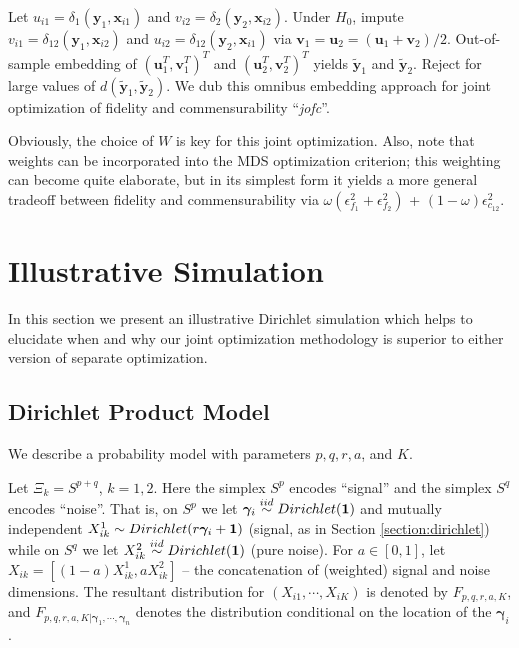 \documentclass[12pt,xcolor]{article}
\newcommand{\1}{\ensuremath{\mbox{{\bf 1}}}}
\newcommand{\iid}{\stackrel{iid}{\sim}}
\begin{document}
  Let $u_{i1} = \delta_1(\bm{y}_{1}, \bm{x}_{i1})$ and $v_{i2} = \delta_2(\bm{y}_{2}, \bm{x}_{i2})$.
  Under $H_0$, impute $v_{i1} = \delta_{12}(\bm{y}_1,\bm{x}_{i2})$ and $u_{i2} = \delta_{12}(\bm{y}_2,\bm{x}_{i1})$
  via $\bm{v}_1 = \bm{u}_2 = (\bm{u}_1 + \bm{v}_2)/2$.
  Out-of-sample embedding of $(\bm{u}_1^T, \bm{v}_1^T)^T$ and $(\bm{u}_2^T, \bm{v}_2^T)^T$ yields $\widetilde{\bm{y}}_1$ and $\widetilde{\bm{y}}_2$.
  Reject for large values of $d(\widetilde{\bm{y}}_1,\widetilde{\bm{y}}_2)$.
We dub this omnibus embedding approach for joint optimization of fidelity and commensurability ``{\it jofc}''.

Obviously, the choice of $W$ is key for this joint optimization.
Also, note that weights can be incorporated into the MDS optimization criterion;
this weighting can become quite elaborate,
but in its simplest form it yields a more general tradeoff between fidelity and commensurability via $\omega (\epsilon^2_{f_{1}} + \epsilon^2_{f_{2}})$ + $(1-\omega) \epsilon^2_{c_{12}}$.

\section{Illustrative Simulation}

In this section we present an illustrative Dirichlet simulation
which helps to elucidate when and why our joint optimization methodology is superior to
either version of separate optimization.

\subsection{Dirichlet Product Model}

We describe a probability model with parameters $p,q,r,a$, and $K$.

Let $\Xi_k = S^{p+q}$, $k=1,2$.
Here the simplex $S^p$ encodes ``signal'' and
the simplex $S^q$ encodes ``noise''.
That is, on $S^p$ we let $\bm{\gamma}_i \iid Dirichlet(\1)$
and mutually independent $X^1_{ik} \sim Dirichlet(r\bm{\gamma}_i+\1)$
(signal, as in Section \ref{section:dirichlet})
while on $S^q$ we let $X^2_{ik} \iid Dirichlet(\1)$ (pure noise).
For $a \in [0,1]$, let $X_{ik} = [(1-a) X^1_{ik} , a X^2_{ik}]$ --
the concatenation of (weighted) signal and noise dimensions.
The resultant distribution for $(X_{i1},\cdots,X_{iK})$ is denoted by $F_{p,q,r,a,K}$,
and $F_{p,q,r,a,K|\bm{\gamma}_1,\cdots,\bm{\gamma}_n}$ denotes the distribution conditional on the location of the $\bm{\gamma}_i$.
\end{document}
